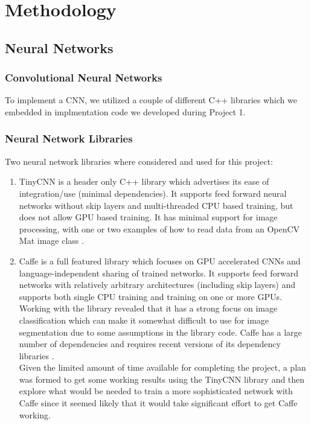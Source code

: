 \documentclass[12pt]{article}
\begin{document}
\section{Methodology}
\subsection{Neural Networks}
\subsubsection{Convolutional Neural Networks}
To implement a CNN, we utilized a couple of different C++ libraries which we embedded in implmentation code we developed during Project 1.
\subsubsection{Neural Network Libraries}
	Two neural network libraries where considered and used for this project:\\
\begin{enumerate}
	\item TinyCNN is a header only C++ library which advertises its ease of integration/use (minimal dependencies).  It supports feed forward neural networks without skip layers and  multi-threaded CPU based training, but does not allow GPU based training.  It has minimal support for image processing, with one or two examples of how to read data from an OpenCV Mat image class \cite{tinyCNN}.  \\
	\item Caffe is a full featured library which focuses on GPU accelerated CNNs and language-independent sharing of trained networks.  It supports feed forward networks with relatively arbitrary architectures (including skip layers) and supports both single CPU training and training on one or more GPUs.  Working with the library revealed that it has a strong focus on image classification which can make it somewhat difficult to use for image segmentation due to some assumptions in the library code.  Caffe has a large number of dependencies and requires recent versions of its dependency libraries \cite{caffe}.\\
	Given the limited amount of time available for completing the project, a plan was formed to get some working results using the TinyCNN library and then explore what would be needed to train a more sophisticated network with Caffe since it seemed likely that it would take significant effort to get Caffe working.
\end{enumerate}
\end{document}

